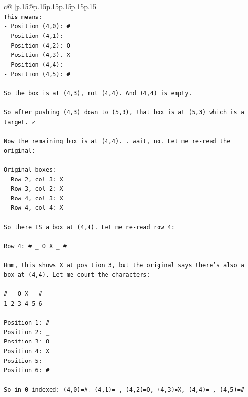 \documentclass{article}
\begin{document}
{\begin{supertabular}{c@{$\;$}|p{.15\linewidth}@{}p{.15\linewidth}p{.15\linewidth}p{.15\linewidth}p{.15\linewidth}p{.15\linewidth}}
{{{\\ 
\texttt{This means:} \\
\texttt{{-} Position (4,0): \#} \\
\texttt{{-} Position (4,1): \_} \\
\texttt{{-} Position (4,2): O} \\
\texttt{{-} Position (4,3): X} \\
\texttt{{-} Position (4,4): \_} \\
\texttt{{-} Position (4,5): \#} \\
\\ 
\texttt{So the box is at (4,3), not (4,4). And (4,4) is empty.} \\
\\ 
\texttt{So after pushing (4,3) down to (5,3), that box is at (5,3) which is a target. ✓} \\
\\ 
\texttt{Now the remaining box is at (4,4)... wait, no. Let me re{-}read the original:} \\
\\ 
\texttt{Original boxes:} \\
\texttt{{-} Row 2, col 3: X} \\
\texttt{{-} Row 3, col 2: X} \\
\texttt{{-} Row 4, col 3: X} \\
\texttt{{-} Row 4, col 4: X} \\
\\ 
\texttt{So there IS a box at (4,4). Let me re{-}read row 4:} \\
\\ 
\texttt{Row 4: \# \_ O X \_ \#} \\
\\ 
\texttt{Hmm, this shows X at position 3, but the original says there's also a box at (4,4). Let me count the characters:} \\
\\ 
\texttt{\# \_ O X \_ \#} \\
\texttt{1 2 3 4 5 6} \\
\\ 
\texttt{Position 1: \#} \\
\texttt{Position 2: \_} \\
\texttt{Position 3: O} \\
\texttt{Position 4: X} \\
\texttt{Position 5: \_} \\
\texttt{Position 6: \#} \\
\\ 
\texttt{So in 0{-}indexed: (4,0)=\#, (4,1)=\_, (4,2)=O, (4,3)=X, (4,4)=\_, (4,5)=\#} \\
}}}
\end{supertabular}}
\end{document}
